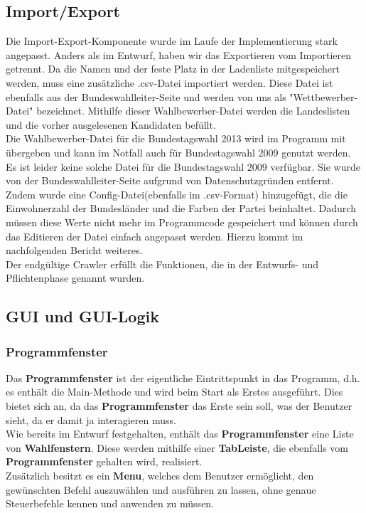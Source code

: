 \documentclass[12pt,a4paper,titlepage]{article}
\newcommand{\myma}{\fontfamily{pcr}\selectfont \textbf}
\begin{document}
\subsection{Import/Export}	
Die Import-Export-Komponente wurde im Laufe der Implementierung stark angepasst. Anders als im Entwurf, haben wir das Exportieren vom Importieren getrennt. Da die Namen und der feste Platz in der Ladenliste mitgespeichert werden, muss eine zusätzliche .csv-Datei importiert werden. Diese Datei ist ebenfalls aus der Bundeswahlleiter-Seite und werden von uns als "Wettbewerber-Datei" bezeichnet. Mithilfe dieser Wahlbewerber-Datei werden die Landeslisten und die vorher ausgelesenen Kandidaten befüllt. \\
Die Wahlbewerber-Datei für die Bundestagswahl 2013 wird im Programm mit übergeben und kann im Notfall auch für Bundestagswahl 2009 genutzt werden. Es ist leider keine solche Datei für die Bundestagswahl 2009 verfügbar. Sie wurde von der Bundeswahlleiter-Seite aufgrund von Datenschutzgründen entfernt. \\
Zudem wurde eine Config-Datei(ebenfalls im .csv-Format) hinzugefügt, die die Einwohnerzahl der Bundesländer und die Farben der Partei beinhaltet. Dadurch müssen diese Werte nicht mehr im Programmcode gespeichert und können durch das Editieren der Datei einfach angepasst werden. Hierzu kommt im nachfolgenden Bericht weiteres.\\
Der endgültige Crawler erfüllt die Funktionen, die in der Entwurfs- und Pflichtenphase genannt wurden.

\subsection{GUI und GUI-Logik}

\subsubsection{Programmfenster}
Das {\myma{Programmfenster}} ist der eigentliche Eintrittspunkt in das Programm, d.h. es enthält die Main-Methode und wird beim Start als Erstes ausgeführt. Dies bietet sich an, da das {\myma{Programmfenster}} das Erste sein soll, was der Benutzer sieht, da er damit ja interagieren muss. \\
Wie bereits im Entwurf festgehalten, enthält das {\myma{Programmfenster}} eine Liste von {\myma{Wahlfenstern}}. Diese werden mithilfe einer {\myma{TabLeiste}}, die ebenfalls vom \\{\myma{Programmfenster}} gehalten wird, realisiert. \\
Zusätzlich besitzt es ein {\myma{Menu}}, welches dem Benutzer ermöglicht, den gewünschten Befehl auszuwählen und ausführen zu lassen, ohne genaue Steuerbefehle kennen und anwenden zu müssen. \\
\end{document}
